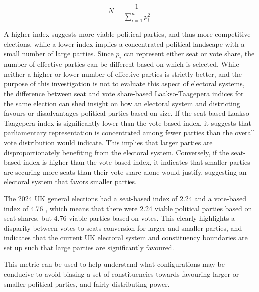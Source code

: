 \documentclass{article}
\begin{document}
\begin{equation}
    N = \frac{1}{\sum_{i=1}^{n}p_i^2}
    \label{eq:ltindex}
\end{equation}

A higher index suggests more viable political parties, and thus more competitive elections, while a lower index implies a concentrated political landscape with a small number of large parties.
Since $p_i$ can represent either seat or vote share, the number of effective parties can be different based on which is selected. While neither a higher or lower number of effective parties is
strictly better, and the purpose of this investigation is not to evaluate this aspect of electoral systems, the difference between seat and vote share-based Laakso-Taagepera indices for the 
same election can shed insight on how an electoral system and districting favours or disadvantages political parties based on size. If the seat-based Laakso-Taagepera index is significantly 
lower than the vote-based index, it suggests that parliamentary representation is concentrated among fewer parties than the overall vote distribution would indicate. This implies that larger 
parties are disproportionately benefiting from the electoral system. Conversely, if the seat-based index is higher than the vote-based index, it indicates that smaller parties are securing more 
seats than their vote share alone would justify, suggesting an electoral system that favors smaller parties.

The 2024 UK general elections had a seat-based index of 2.24 and a vote-based index of 4.76 \cite{electionindices}, which means that there were 2.24 viable political parties based on seat shares, but 4.76
viable parties based on votes. This clearly highlights a disparity between votes-to-seats conversion for larger and smaller parties, and indicates that the current UK electoral system and 
constituency boundaries are set up such that large parties are significantly favoured.

This metric can be used to help understand what configurations may be conducive to avoid biasing a set of constituencies towards favouring larger or smaller political parties, and fairly distributing power.

\end{document}
